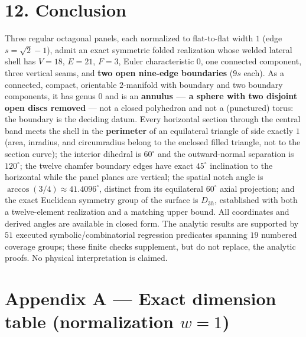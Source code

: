 \documentclass[
  11pt,
  a4paper,
]{article}
\begin{document}
\section{12. Conclusion}\label{conclusion}

Three regular octagonal panels, each normalized to flat-to-flat width \(1\) (edge \(s=\sqrt2-1\)), admit an exact symmetric folded realization whose welded lateral shell has \(V=18\), \(E=21\), \(F=3\), Euler characteristic \(0\), one connected component, three vertical seams, and \textbf{two open nine-edge boundaries} (\(9s\) each). As a connected, compact, orientable \(2\)-manifold with boundary and two boundary components, it has genus \(0\) and is an \textbf{annulus --- a sphere with two disjoint open discs removed} --- not a closed polyhedron and not a (punctured) torus: the boundary is the deciding datum. Every horizontal section through the central band meets the shell in the \textbf{perimeter} of an equilateral triangle of side exactly \(1\) (area, inradius, and circumradius belong to the enclosed filled triangle, not to the section curve); the interior dihedral is \(60^\circ\) and the outward-normal separation is \(120^\circ\); the twelve chamfer boundary edges have exact \(45^\circ\) inclination to the horizontal while the panel planes are vertical; the spatial notch angle is \(\arccos(3/4)\approx41.4096^\circ\), distinct from its equilateral \(60^\circ\) axial projection; and the exact Euclidean symmetry group of the surface is \(D_{3h}\), established with both a twelve-element realization and a matching upper bound. All coordinates and derived angles are available in closed form. The analytic results are supported by \(51\) executed symbolic/combinatorial regression predicates spanning \(19\) numbered coverage groups; these finite checks supplement, but do not replace, the analytic proofs. No physical interpretation is claimed.


\section{\texorpdfstring{Appendix A --- Exact dimension table (normalization \(w=1\))}{Appendix A --- Exact dimension table (normalization w=1)}}\label{appendix-a-exact-dimension-table-normalization-w1}

\begingroup\fontsize{9.3}{12}\selectfont\setlength{\tabcolsep}{4pt}\renewcommand{\arraystretch}{1.3}
\end{document}
